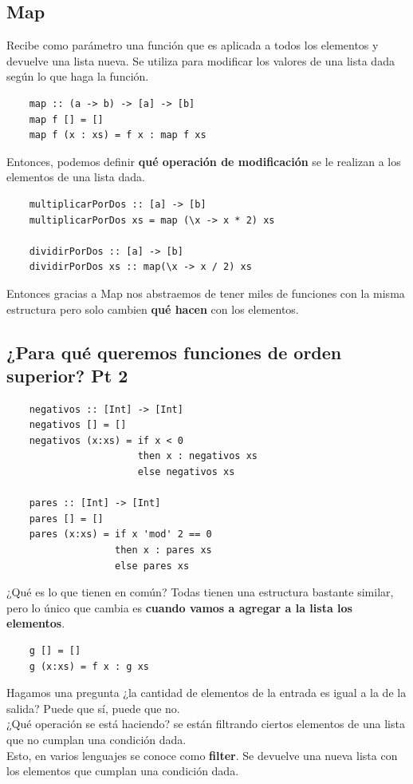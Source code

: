 \documentclass[10pt,a4paper]{article}
\begin{document}
\subsection*{Map}
Recibe como parámetro una función que es aplicada a todos los elementos y devuelve una lista nueva. Se utiliza para modificar los valores de una lista dada según lo que haga la función. \\
\begin{lstlisting}
    map :: (a -> b) -> [a] -> [b]
    map f [] = []
    map f (x : xs) = f x : map f xs 
\end{lstlisting}

Entonces, podemos definir \textbf{qué operación de modificación} se le realizan a los elementos de una lista dada.
\begin{lstlisting}
    multiplicarPorDos :: [a] -> [b]
    multiplicarPorDos xs = map (\x -> x * 2) xs 

    dividirPorDos :: [a] -> [b]
    dividirPorDos xs :: map(\x -> x / 2) xs 
\end{lstlisting}
Entonces gracias a Map nos abstraemos de tener miles de funciones con la misma estructura pero solo cambien \textbf{qué hacen} con los elementos. 
\subsection*{¿Para qué queremos funciones de orden superior? Pt 2}
\begin{lstlisting}
    negativos :: [Int] -> [Int]
    negativos [] = []
    negativos (x:xs) = if x < 0 
                       then x : negativos xs
                       else negativos xs 
    
    pares :: [Int] -> [Int]
    pares [] = []
    pares (x:xs) = if x 'mod' 2 == 0
                   then x : pares xs 
                   else pares xs
\end{lstlisting}
¿Qué es lo que tienen en común? Todas tienen una estructura bastante similar, pero lo único que cambia es \textbf{cuando vamos a agregar a la lista los elementos}. \\

\begin{lstlisting}
    g [] = []
    g (x:xs) = f x : g xs
\end{lstlisting}

Hagamos una pregunta ¿la cantidad de elementos de la entrada es igual a la de la salida? Puede que sí, puede que no.   \\
¿Qué operación se está haciendo? se están filtrando ciertos elementos de una lista que no cumplan una condición dada. \\
Esto, en varios lenguajes se conoce como \textbf{filter}. Se devuelve una nueva lista con los elementos que cumplan una condición dada.
\end{document}
